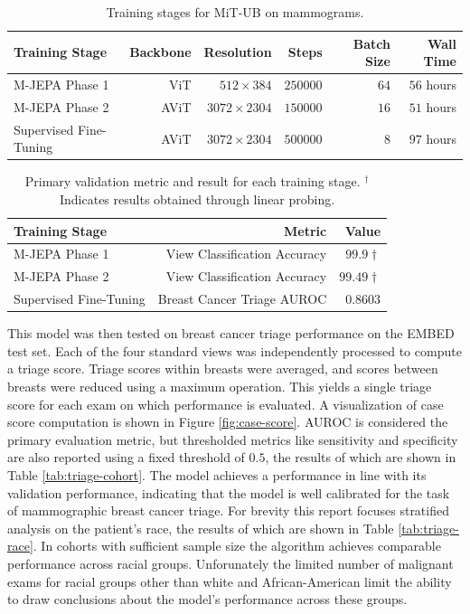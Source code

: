 \documentclass[12pt]{article}
\begin{document}
\begin{table}[H]
    \centering
    \begin{tabular}{l r r r r r}
        \toprule
        Training Stage & Backbone & Resolution & Steps & Batch Size &Wall Time \\
        \midrule
        M-JEPA Phase 1 & ViT & \(512\times384\) & \(250000\) & \(64\) & \(56\) hours \\
        M-JEPA Phase 2 & AViT & \(3072\times2304\) & \(150000\) & \(16\) & \(51\) hours \\
        Supervised Fine-Tuning & AViT & \(3072\times2304\) & \(500000\) & \(8\) & \(97\) hours \\
        \bottomrule
    \end{tabular}
    \caption{Training stages for MiT-UB on mammograms.}
    \label{tab:mammo-training}
\end{table}



\begin{table}[H]
    \centering
    \begin{tabular}{l r r}
        \toprule
        Training Stage & Metric & Value \\
        \midrule
        M-JEPA Phase 1 & View Classification Accuracy & \(99.9\dagger\) \\
        M-JEPA Phase 2 & View Classification Accuracy & \(99.49\dagger\) \\
        Supervised Fine-Tuning & Breast Cancer Triage AUROC & \(0.8603\) \\
        \bottomrule
    \end{tabular}
    \caption{Primary validation metric and result for each training stage. $^\dagger$Indicates results obtained through linear probing.}
    \label{tab:mammo-val-metrics}
\end{table}

This model was then tested on breast cancer triage performance on the EMBED test set. Each of the four standard views was independently processed to compute a triage score. Triage scores within breasts were averaged, and scores between breasts were reduced using a maximum operation. This yields a single triage score for each exam on which performance is evaluated.
A visualization of case score computation is shown in Figure \ref{fig:case-score}.
AUROC is considered the primary evaluation metric, but thresholded metrics like sensitivity and specificity are also reported using a fixed threshold of $0.5$, the results of which are shown in Table \ref{tab:triage-cohort}. The model achieves a performance in line with its validation performance, indicating that the model is well calibrated for the task of mammographic breast cancer triage.
For brevity this report focuses stratified analysis on the patient's race, the results of which are shown in Table \ref{tab:triage-race}. In cohorts with sufficient sample size the algorithm achieves comparable performance across racial groups. Unforunately the limited number of malignant exams for racial groups other than white and African-American limit the ability to draw conclusions about the model's performance across these groups.
\end{document}
